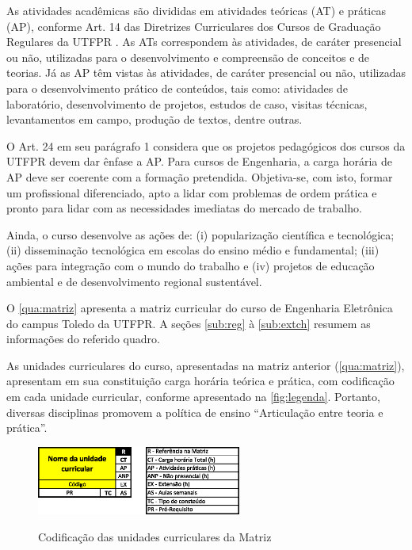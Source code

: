 As atividades acadêmicas são divididas em atividades teóricas (AT) e práticas (AP), conforme Art. 14 das Diretrizes Curriculares dos Cursos de Graduação Regulares da UTFPR \cite{cogep90}. As ATs correspondem às atividades, de caráter presencial ou não, utilizadas para o desenvolvimento e compreensão de conceitos e de teorias. Já as AP têm vistas às atividades, de caráter presencial ou não, utilizadas para o desenvolvimento prático de conteúdos, tais como: atividades de laboratório, desenvolvimento de projetos, estudos de caso, visitas técnicas, levantamentos em campo, produção de textos, dentre outras.

O Art. 24 em seu parágrafo 1\textordmasculine{} considera que os projetos pedagógicos dos cursos da UTFPR devem dar ênfase a AP. Para cursos de Engenharia, a carga horária de AP deve ser coerente com a formação pretendida. Objetiva-se, com isto, formar um profissional diferenciado, apto a lidar com problemas de ordem prática e pronto para lidar com as necessidades imediatas do mercado de trabalho.

Ainda, o curso desenvolve as ações de: (i) popularização científica e tecnológica; (ii) disseminação tecnológica em escolas do ensino médio e fundamental; (iii) ações para integração com o mundo do trabalho e (iv) projetos de educação ambiental e de desenvolvimento regional sustentável.

O \autoref{qua:matriz} apresenta a matriz curricular do curso de Engenharia Eletrônica do campus Toledo da UTFPR.  A seções \ref{sub:reg} à \ref{sub:extch} resumem as informações do referido quadro.

As unidades curriculares do curso, apresentadas na matriz anterior (\autoref{qua:matriz}), apresentam em sua constituição carga horária teórica e prática, com codificação em cada unidade curricular, conforme apresentado na \autoref{fig:legenda}. Portanto, diversas disciplinas promovem a política de ensino ``Articulação entre teoria e prática''.

\begin{figure}[hbt!]
	\centering
	\caption{Codificação das unidades curriculares da Matriz}
	\includegraphics[width=0.6\textwidth]{Caps/Figs/legenda.eps}
	\fonte{\utf}
	\label{fig:legenda}
\end{figure}

